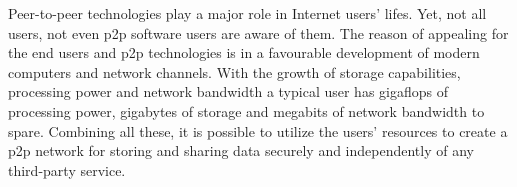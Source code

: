 Peer-to-peer technologies play a major role in Internet users' lifes.
Yet, not all users, not even p2p software users are aware of them.
The reason of appealing for the end users and p2p technologies
is in a favourable development of modern computers and network channels.
With the growth of storage capabilities, processing power and network
bandwidth a typical user has gigaflops of processing power, gigabytes
of storage and megabits of network bandwidth to spare. Combining all
these, it is possible to utilize the users' resources to create a
p2p network for storing and sharing data securely and independently
of any third-party service.
